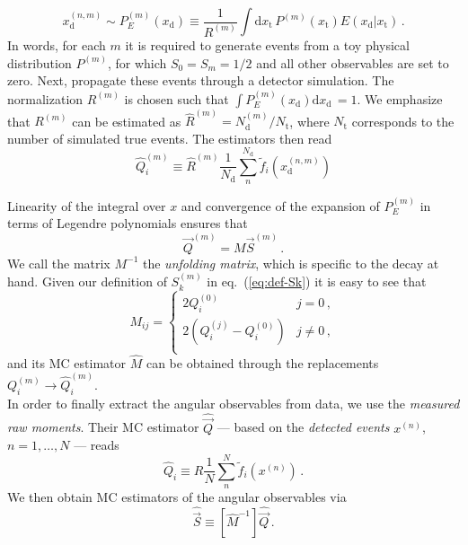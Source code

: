 \documentclass[aps,nofootinbib,preprintnumbers,prd,twocolumn]{revtex4-1}
\newcommand{\est}[1]{\widehat{#1}}
\newcommand{\refeq}[1]{eq.~(\ref{eq:#1})}
\newcommand{\rmdx}[1]{\mbox{d} #1 \,} %
\newcommand{\subd}{_{\text{d}}}
\newcommand{\subt}{_{\text{t}}}
\newcommand{\vecest}[1]{\widehat{\vec{#1}}}
\newcommand{\xd}{x\subd}
\newcommand{\xt}{x\subt}
\newcommand{\Ekernel}{E(\xd|\xt)}
\begin{document}
\begin{equation}
    x_\text{d}^{(n,m)} \sim P_E^{(m)}(\xd) \equiv \frac{1}{R^{(m)}} \int \rmdx{\xt} P^{(m)}(\xt) \Ekernel\,.
\end{equation}
In words, for each $m$ it is required to generate events from
a toy physical distribution $P^{(m)}$, for which $S_0 = S_m=1/2$ and all other
observables are set to zero. Next, propagate these events through
a detector simulation. The normalization $R^{(m)}$ is chosen such
that $\int P_E^{(m)}(\xd) \rmdx{\xd} = 1$.  We emphasize that
$R^{(m)}$ can be estimated as $\est{R}^{(m)} = N_\text{d}^{(m)} /
N_\text{t}$, where $N_\text{t}$ corresponds to the number of
simulated true events.  The estimators then read
\begin{equation}
    \est{Q}_i^{(m)} \equiv \est{R}^{(m)} \frac{1}{N_\text{d}} \sum_n^{N_\text{d}} \tilde{f}_i(x_\text{d}^{(n,m)})
\end{equation}

Linearity of the integral over $x$ and convergence of the expansion of
$P_E^{(m)}$ in terms of Legendre polynomials ensures that
\begin{equation}
    \vec{Q}^{(m)} = M \vec{S}^{(m)}\,.
\end{equation}
We call the matrix $M^{-1}$ the \emph{unfolding matrix},
which is specific to the decay at hand.
Given our definition of $S_k^{(m)}$ in
\refeq{def-Sk} it is easy to see that
\begin{equation}
    M_{ij} = \begin{cases}
        2 Q_i^{(0)}                          & j = 0\,,\\
        2\left(Q_i^{(j)} - Q_i^{(0)}\right)  & j \neq 0\,,\\
    \end{cases}
\end{equation}
and its MC estimator $\est{M}$  can be obtained through the replacements $Q_i^{(m)} \to \est{Q}_i^{(m)}$.\\

In order to finally extract the angular observables from data, we use the \emph{measured raw moments}. Their MC estimator
$\vecest{Q}$ --- based on the \emph{detected events} $x^{(n)}$, $n=1,\dots,N$ --- reads
\begin{equation}
    \est{Q}_i \equiv R \frac{1}{N} \sum_n^N \tilde{f}_i(x^{(n)})\,.
\end{equation}
We then obtain MC estimators of the angular observables via
\begin{equation}
    \label{eq:estS}
    \vecest{S} \equiv \left[\est{M}^{-1}\right] \vecest{Q}\,.
\end{equation}
\end{document}
